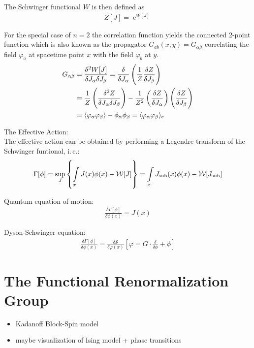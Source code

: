 The Schwinger functional $W$ is then defined as
\begin{align}
	Z[J] = \operatorname{e}^{W[J]}
\end{align}

For the special case of $n=2$ the correlation function yields the connected 2-point function which is also known as the propagator $G_{ab}(x,y) = G_{\alpha\beta}$ correlating the field $\varphi_a$ at spacetime point $x$ with the field $\varphi_b$ at $y$.
\begin{align}
	G_{\alpha\beta} &= \frac{\delta^2W[J]}{\delta J_{\alpha}\delta J_{\beta}} = \frac{\delta}{\delta J_{\alpha}}\left(\frac{1}{Z}\frac{\delta Z}{\delta J_{\beta}}\right) \nonumber \\
				&= \frac{1}{Z}\left(\frac{\delta^2Z}{\delta J_{\alpha}\delta J_{\beta}}\right) - \frac{1}{Z^2}\left(\frac{\delta Z}{\delta J_{\alpha}}\right)\left(\frac{\delta Z}{\delta J_{\beta}}\right)\\
				&= \langle \varphi_{\alpha}\varphi_{\beta} \rangle - \phi_{\alpha}\phi_{\beta} = \langle \varphi_{\alpha}\varphi_{\beta} \rangle_{\text{c}}	\nonumber	
\end{align}

The Effective Action:\\

The effective action can be obtained by performing a Legendre transform of the Schwinger funtional, i.\,e.:
\begin{align}
\Gamma[\phi] = \underset{J}{\operatorname{sup}}\left\{ \int\limits_x J(x)\phi(x) - \mathcal{W}[J] \right\} = \int\limits_x J_{\text{sub}}(x)\phi(x) - \mathcal{W}[J_{\text{sub}}]
\end{align}

Quantum equation of motion:
\begin{align}
\frac{\delta\Gamma[\phi]}{\delta\phi(x)} = J(x)	
\end{align}

Dyson-Schwinger equation:
\begin{align}
\frac{\delta\Gamma[\phi]}{\delta\phi(x)} = \frac{\delta\mathcal{S}}{\delta\varphi(x)} \left[\varphi = G \cdot \frac{\delta}{\delta\phi} + \phi \right]
\end{align}

\section{The Functional Renormalization Group}
\begin{itemize}
	\item Kadanoff Block-Spin model 
	\item maybe visualization of Ising model + phase transitions
\end{itemize}


